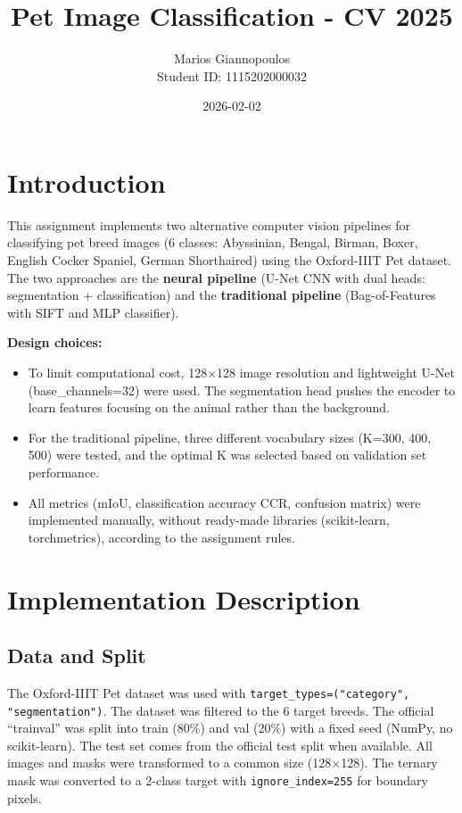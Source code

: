 \documentclass{article}
\title{Pet Image Classification - CV 2025}
\author{Marios Giannopoulos\\Student ID: 1115202000032}
\date{2026-02-02}
\begin{document}
\maketitle
\tableofcontents

\section{Introduction}
\label{sec:introduction}

This assignment implements two alternative computer vision pipelines for classifying pet breed images (6 classes: Abyssinian, Bengal, Birman, Boxer, English Cocker Spaniel, German Shorthaired) using the Oxford-IIIT Pet dataset. The two approaches are the \textbf{neural pipeline} (U-Net CNN with dual heads: segmentation + classification) and the \textbf{traditional pipeline} (Bag-of-Features with SIFT and MLP classifier).

\textbf{Design choices:}
\begin{itemize}
    \item To limit computational cost, 128$\times$128 image resolution and lightweight U-Net (base\_channels=32) were used. The segmentation head pushes the encoder to learn features focusing on the animal rather than the background.
    \item For the traditional pipeline, three different vocabulary sizes (K=300, 400, 500) were tested, and the optimal K was selected based on validation set performance.
    \item All metrics (mIoU, classification accuracy CCR, confusion matrix) were implemented manually, without ready-made libraries (scikit-learn, torchmetrics), according to the assignment rules.
\end{itemize}

\section{Implementation Description}
\label{sec:implementation}

\subsection{Data and Split}

The Oxford-IIIT Pet dataset was used with \texttt{target\_types=("category", "segmentation")}. The dataset was filtered to the 6 target breeds. The official ``trainval'' was split into train (80\%) and val (20\%) with a fixed seed (NumPy, no scikit-learn). The test set comes from the official test split when available. All images and masks were transformed to a common size (128$\times$128). The ternary mask was converted to a 2-class target with \texttt{ignore\_index=255} for boundary pixels.
\end{document}

